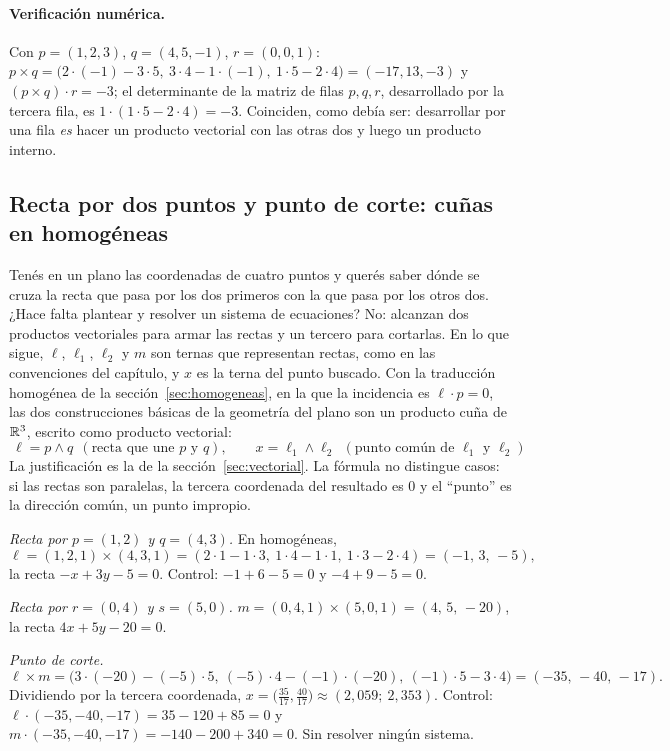 \paragraph{Verificación numérica.} Con \(p=(1,2,3)\), \(q=(4,5,-1)\),
\(r=(0,0,1)\): \(p\times q=\bigl(2\cdot(-1)-3\cdot5,\ 3\cdot4-1\cdot(-1),\
1\cdot5-2\cdot4\bigr)=(-17,13,-3)\) y \((p\times q)\cdot r=-3\); el determinante de la matriz de filas \(p,q,r\), desarrollado por la tercera fila, es
\(1\cdot(1\cdot5-2\cdot4)=-3\). Coinciden, como debía ser: desarrollar por una fila
\emph{es} hacer un producto vectorial con las otras dos y luego un producto interno.

\subsection{Recta por dos puntos y punto de corte: cuñas en homogéneas}\label{sec:cunas-homogeneas}

Tenés en un plano las coordenadas de cuatro puntos y querés saber dónde se cruza la recta que
pasa por los dos primeros con la que pasa por los otros dos. ¿Hace falta plantear y resolver un
sistema de ecuaciones?
No: alcanzan dos productos vectoriales para armar las rectas y un tercero para cortarlas. En
lo que sigue, \(\ell\), \(\ell_1\), \(\ell_2\) y \(m\) son ternas que representan rectas, como
en las convenciones del capítulo, y \(x\) es la terna del punto buscado. Con la traducción
homogénea de la sección~\ref{sec:homogeneas}, en la que la incidencia es
\(\ell\cdot p=0\), las dos construcciones básicas de la geometría del plano son un producto
cuña de \(\mathbb{R}^3\), escrito como producto vectorial:
\[
  \boxed{\ \ell=p\wedge q\ \ (\text{recta que une }p\text{ y }q),\qquad
  x=\ell_1\wedge\ell_2\ \ (\text{punto común de }\ell_1\text{ y }\ell_2)\ }
\]
La justificación es la de la sección~\ref{sec:vectorial}. La fórmula no distingue casos: si
las rectas son paralelas, la tercera coordenada del resultado es \(0\) y el \enquote{punto}
es la dirección común, un punto impropio.

\begin{ejemplo}\label{ej:cuna-homogeneas}
\emph{Recta por \(p=(1,2)\) y \(q=(4,3)\).} En homogéneas,
\[
  \ell=(1,2,1)\times(4,3,1)=(2\cdot1-1\cdot3,\ 1\cdot4-1\cdot1,\ 1\cdot3-2\cdot4)=(-1,\,3,\,-5),
\]
la recta \(-x+3y-5=0\). Control: \(-1+6-5=0\) y \(-4+9-5=0\).

\emph{Recta por \(r=(0,4)\) y \(s=(5,0)\).} \(m=(0,4,1)\times(5,0,1)=(4,\,5,\,-20)\), la
recta \(4x+5y-20=0\).

\emph{Punto de corte.}
\[
  \ell\times m=\bigl(3\cdot(-20)-(-5)\cdot5,\ (-5)\cdot4-(-1)\cdot(-20),\ (-1)\cdot5-3\cdot4\bigr)
  =(-35,\,-40,\,-17).
\]
Dividiendo por la tercera coordenada, \(x=\bigl(\tfrac{35}{17},\tfrac{40}{17}\bigr)\approx
(2{,}059;\ 2{,}353)\). Control: \(\ell\cdot(-35,-40,-17)=35-120+85=0\) y
\(m\cdot(-35,-40,-17)=-140-200+340=0\). Sin resolver ningún sistema.
\end{ejemplo}

